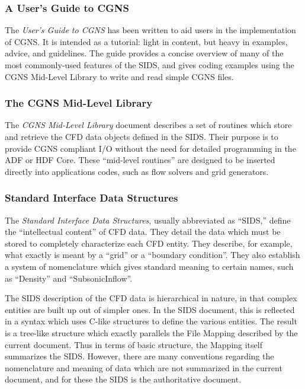 \subsubsection{A User's Guide to CGNS}

The \textit{User's Guide to CGNS} has been written to aid users in the
implementation of CGNS.
It is intended as a tutorial: light in content, but heavy in examples,
advice, and guidelines.
The guide provides a concise overview of many of the most commonly-used
features of the SIDS, and gives coding examples using the CGNS Mid-Level
Library to write and read simple CGNS files.

\subsubsection{The CGNS Mid-Level Library}

The \textit{CGNS Mid-Level Library} document describes a set of routines
which store and retrieve the CFD data objects defined in the SIDS.
Their purpose is to provide CGNS compliant I/O without the need for
detailed programming in the ADF or HDF Core.
These ``mid-level routines'' are designed to be inserted directly into
applications codes, such as flow solvers and grid generators.

\subsubsection{Standard Interface Data Structures}

The \textit{Standard Interface Data Structures}, usually abbreviated as
``SIDS,'' define the ``intellectual content'' of CFD data.
They detail the data which must be stored to completely characterize
each CFD entity. They describe, for example, what exactly is meant by a
``grid'' or a ``boundary condition''.
They also establish a system of nomenclature which gives standard
meaning to certain names, such as ``Density'' and ``SubsonicInflow''.

The SIDS description of the CFD data is hierarchical in nature, in that
complex entities are built up out of simpler ones. In the SIDS document,
this is reflected in a syntax which uses C-like structures to define
the various entities. The result is a tree-like structure which
exactly parallels the File Mapping described by the current
document. Thus in terms of
basic structure, the Mapping itself summarizes the SIDS. However, there
are many conventions regarding the nomenclature and meaning of data
which are not summarized in the current document, and for these the SIDS
is the authoritative document.

